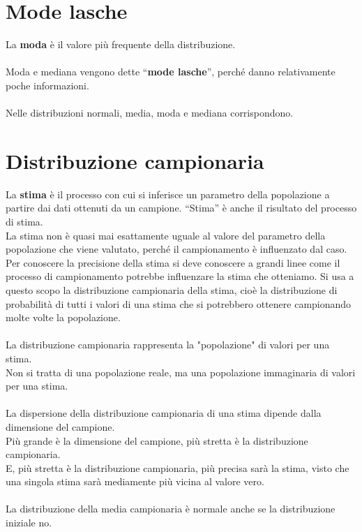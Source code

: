 \documentclass[10pt, draft]{book}
\begin{document}
\section{Mode lasche}
La \textbf{moda} è il valore più frequente della distribuzione.
\\
\\
Moda e mediana vengono dette “\textbf{mode lasche}”, perché danno relativamente poche informazioni.
\\
\\
Nelle distribuzioni normali, media, moda e mediana corrispondono.

\section{Distribuzione campionaria}
La \textbf{stima} è il processo con cui si inferisce un parametro della popolazione a partire dai dati ottenuti da un campione. ``Stima'' è anche il risultato del processo di stima.
\\
La stima non è quasi mai esattamente uguale al valore del parametro della popolazione che viene valutato, perché il campionamento è influenzato dal caso.
\\
Per conoscere la precisione della stima si deve conoscere a grandi linee come il processo di campionamento potrebbe influenzare la stima che otteniamo. Si usa a questo scopo la distribuzione campionaria della stima, cioè la distribuzione di probabilità di tutti i valori di una stima che si potrebbero ottenere campionando molte volte la popolazione.
\\
\\
La distribuzione campionaria rappresenta la "popolazione" di valori per una stima. 
\\
Non si tratta di una popolazione reale, ma una popolazione immaginaria di valori per una stima.
\\
\\
La dispersione della distribuzione campionaria di una stima dipende dalla dimensione del campione. 
\\
Più grande è la dimensione del campione, più stretta è la distribuzione campionaria. 
\\
E, più stretta è la distribuzione campionaria, più precisa sarà la stima, visto che una singola stima sarà mediamente più vicina al valore vero.
\\
\\
La distribuzione della media campionaria è normale anche se la distribuzione iniziale no.
\end{document}
